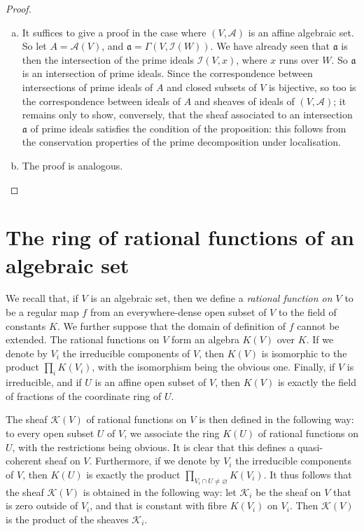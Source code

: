 \documentclass{article}
\theoremstyle{plain}
\theoremstyle{definition}
\newcommand{\sh}{\mathscr}
\newcommand{\oldpage}[1]{\marginpar{\footnotesize$\Big\vert$ \textit{p.~#1}}}
\begin{document}
\begin{proof}
  \begin{enumerate}[(a)]
    \item It suffices to give a proof in the case where $(V,\sh{A})$ is an affine algebraic set.
      So let $A=\sh{A}(V)$, and $\mathfrak{a}=\Gamma(V,\sh{I}(W))$.
      We have already seen that $\mathfrak{a}$ is then the intersection of the prime ideals $\sh{I}(V,x)$, where $x$ runs over $W$.
      So $\mathfrak{a}$ is an intersection of prime ideals.
      Since the correspondence between intersections of prime ideals of $A$ and closed subsets of $V$ is bijective, so too is the correspondence between ideals of $A$ and sheaves of ideals of $(V,\sh{A})$;
      it remains only to show, conversely, that the sheaf associated to an intersection $\mathfrak{a}$ of prime ideals satisfies the condition of the proposition: this follows from the conservation properties of the prime decomposition under localisation.
    \item The proof is analogous.
  \end{enumerate}
\end{proof}


\section{The ring of rational functions of an algebraic set}
\label{section3}

We recall that, if $V$ is an algebraic set, then we define a \emph{rational function on $V$} to be a regular map $f$ from an everywhere-dense open subset of $V$ to the field of constants $K$.
We further suppose that the domain of definition of $f$ cannot be extended.
The rational functions on $V$ form an algebra $K(V)$ over $K$.
If we denote by $V_i$ the irreducible components of $V$, then $K(V)$ is isomorphic to the product $\prod_i K(V_i)$, with the isomorphism being the obvious one.
Finally, if $V$ is irreducible, and if $U$ is an affine open subset of $V$, then $K(V)$ is exactly the field of fractions of the coordinate ring of $U$.

The sheaf $\sh{K}(V)$ of rational functions on $V$ is then defined in the following way:
to every open subset $U$ of $V$, we associate the ring $K(U)$ of
\oldpage{2-04}
rational functions on $U$, with the restrictions being obvious.
It is clear that this defines a quasi-coherent sheaf on $V$.
Furthermore, if we denote by $V_i$ the irreducible components of $V$, then $K(U)$ is exactly the product $\prod_{V_i\cap U\neq\varnothing}K(V_i)$.
It thus follows that the sheaf $\sh{K}(V)$ is obtained in the following way:
let $\sh{K}_i$ be the sheaf on $V$ that is zero outside of $V_i$, and that is constant with fibre $K(V_i)$ on $V_i$.
Then $\sh{K}(V)$ is the product of the sheaves $\sh{K}_i$.
\end{document}
